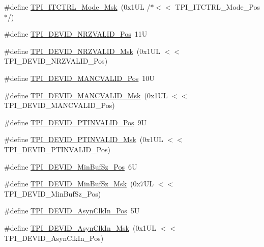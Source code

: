 \begin{DoxyCompactItemize}
\item 
\#define \mbox{\hyperlink{group___c_m_s_i_s___t_p_i_gad6f87550b468ad0920d5f405bfd3f017}{T\+P\+I\+\_\+\+I\+T\+C\+T\+R\+L\+\_\+\+Mode\+\_\+\+Msk}}~(0x1\+U\+L /$\ast$$<$$<$ T\+P\+I\+\_\+\+I\+T\+C\+T\+R\+L\+\_\+\+Mode\+\_\+\+Pos$\ast$/)
\item 
\#define \mbox{\hyperlink{group___c_m_s_i_s___t_p_i_ga9f46cf1a1708575f56d6b827766277f4}{T\+P\+I\+\_\+\+D\+E\+V\+I\+D\+\_\+\+N\+R\+Z\+V\+A\+L\+I\+D\+\_\+\+Pos}}~11U
\item 
\#define \mbox{\hyperlink{group___c_m_s_i_s___t_p_i_gacecc8710a8f6a23a7d1d4f5674daf02a}{T\+P\+I\+\_\+\+D\+E\+V\+I\+D\+\_\+\+N\+R\+Z\+V\+A\+L\+I\+D\+\_\+\+Msk}}~(0x1\+U\+L $<$$<$ T\+P\+I\+\_\+\+D\+E\+V\+I\+D\+\_\+\+N\+R\+Z\+V\+A\+L\+I\+D\+\_\+\+Pos)
\item 
\#define \mbox{\hyperlink{group___c_m_s_i_s___t_p_i_ga675534579d9e25477bb38970e3ef973c}{T\+P\+I\+\_\+\+D\+E\+V\+I\+D\+\_\+\+M\+A\+N\+C\+V\+A\+L\+I\+D\+\_\+\+Pos}}~10U
\item 
\#define \mbox{\hyperlink{group___c_m_s_i_s___t_p_i_ga4c3ee4b1a34ad1960a6b2d6e7e0ff942}{T\+P\+I\+\_\+\+D\+E\+V\+I\+D\+\_\+\+M\+A\+N\+C\+V\+A\+L\+I\+D\+\_\+\+Msk}}~(0x1\+U\+L $<$$<$ T\+P\+I\+\_\+\+D\+E\+V\+I\+D\+\_\+\+M\+A\+N\+C\+V\+A\+L\+I\+D\+\_\+\+Pos)
\item 
\#define \mbox{\hyperlink{group___c_m_s_i_s___t_p_i_ga974cccf4c958b4a45cb71c7b5de39b7b}{T\+P\+I\+\_\+\+D\+E\+V\+I\+D\+\_\+\+P\+T\+I\+N\+V\+A\+L\+I\+D\+\_\+\+Pos}}~9U
\item 
\#define \mbox{\hyperlink{group___c_m_s_i_s___t_p_i_ga1ca84d62243e475836bba02516ba6b97}{T\+P\+I\+\_\+\+D\+E\+V\+I\+D\+\_\+\+P\+T\+I\+N\+V\+A\+L\+I\+D\+\_\+\+Msk}}~(0x1\+U\+L $<$$<$ T\+P\+I\+\_\+\+D\+E\+V\+I\+D\+\_\+\+P\+T\+I\+N\+V\+A\+L\+I\+D\+\_\+\+Pos)
\item 
\#define \mbox{\hyperlink{group___c_m_s_i_s___t_p_i_ga3f7da5de2a34be41a092e5eddd22ac4d}{T\+P\+I\+\_\+\+D\+E\+V\+I\+D\+\_\+\+Min\+Buf\+Sz\+\_\+\+Pos}}~6U
\item 
\#define \mbox{\hyperlink{group___c_m_s_i_s___t_p_i_ga939e068ff3f1a65b35187ab34a342cd8}{T\+P\+I\+\_\+\+D\+E\+V\+I\+D\+\_\+\+Min\+Buf\+Sz\+\_\+\+Msk}}~(0x7\+U\+L $<$$<$ T\+P\+I\+\_\+\+D\+E\+V\+I\+D\+\_\+\+Min\+Buf\+Sz\+\_\+\+Pos)
\item 
\#define \mbox{\hyperlink{group___c_m_s_i_s___t_p_i_gab382b1296b5efd057be606eb8f768df8}{T\+P\+I\+\_\+\+D\+E\+V\+I\+D\+\_\+\+Asyn\+Clk\+In\+\_\+\+Pos}}~5U
\item 
\#define \mbox{\hyperlink{group___c_m_s_i_s___t_p_i_gab67830557d2d10be882284275025a2d3}{T\+P\+I\+\_\+\+D\+E\+V\+I\+D\+\_\+\+Asyn\+Clk\+In\+\_\+\+Msk}}~(0x1\+U\+L $<$$<$ T\+P\+I\+\_\+\+D\+E\+V\+I\+D\+\_\+\+Asyn\+Clk\+In\+\_\+\+Pos)
$$
\end{DoxyCompactItemize}
